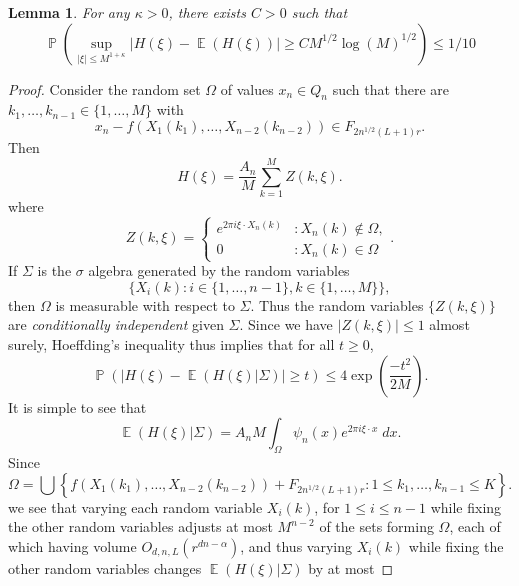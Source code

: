 \documentclass[dvipsnames,letterpaper,12pt]{article}
\numberwithin{equation}{section}
\newtheorem{lemma}[theorem]{Lemma}
\numberwithin{theorem}{section}
\DeclareMathOperator{\EE}{\mathbb{E}}
\DeclareMathOperator{\PP}{\mathbb{P}}
\begin{document}
\begin{lemma} \label{lastconcentrationbound}
    For any $\kappa > 0$, there exists $C > 0$ such that
    \[ \PP \left( \sup_{|\xi| \leq M^{1 + \kappa}} | H(\xi) - \EE(H(\xi)) | \geq C M^{1/2} \log(M)^{1/2} \right) \leq 1/10 \]
\end{lemma}
\begin{proof}
    Consider the random set $\Omega$ of values $x_n \in Q_n$ such that there are $k_1,\dots,k_{n-1} \in \{ 1,\dots,M \}$ with
    \begin{equation}
        x_n - f(X_1(k_1), \dots, X_{n-2}(k_{n-2})) \in F_{2 n^{1/2} (L+1) r}.
    \end{equation}
    Then
    \begin{equation}
        H(\xi) = \frac{A_n}{M} \sum_{k = 1}^M Z(k,\xi).
    \end{equation}
    where
    \[ Z(k,\xi) = \begin{cases} e^{2 \pi i \xi \cdot X_n(k)} &: X_n(k) \not \in \Omega, \\ 0 &: X_n(k) \in \Omega \end{cases}. \]
    If $\Sigma$ is the $\sigma$ algebra generated by the random variables
    \[ \{ X_i(k) : i \in \{ 1, \dots, n-1 \}, k \in \{ 1, \dots, M \} \}, \]
    then $\Omega$ is measurable with respect to $\Sigma$. Thus the random variables $\{ Z(k,\xi) \}$ are \emph{conditionally independent} given $\Sigma$. Since we have $|Z(k,\xi)| \leq 1$ almost surely, Hoeffding's inequality thus implies that for all $t \geq 0$,
    \begin{equation} \label{equationCOIJCOIJX1232312ssss}
        \PP \left( \left| H(\xi) - \EE(H(\xi)|\Sigma) \right| \geq t \right) \leq 4 \exp \left( \frac{-t^2}{2M} \right).
    \end{equation}
    It is simple to see that
    \begin{equation}
        \EE(H(\xi) | \Sigma) = A_n M \int_\Omega \psi_n(x) e^{2 \pi i \xi \cdot x}\; dx.
    \end{equation}
    Since
    \begin{equation}
        \Omega = \bigcup \left\{ f(X_1(k_1), \dots, X_{n-2}(k_{n-2})) + F_{2 n^{1/2} (L+1) r} : 1 \leq k_1,\dots,k_{n-1} \leq K \right\}.
    \end{equation}
    we see that varying each random variable $X_i(k)$, for $1 \leq i \leq n-1$ while fixing the other random variables adjusts at most $M^{n-2}$ of the sets forming $\Omega$, each of which having volume $O_{d,n,L}(r^{dn - \alpha})$, and thus varying $X_i(k)$ while fixing the other random variables changes $\EE(H(\xi)|\Sigma)$ by at most

\end{proof}
\end{document}
